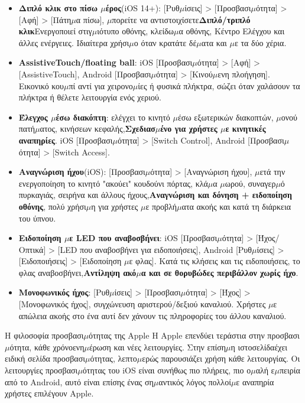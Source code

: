\begin{itemize}
  \item \textbf{Διπλό κλικ στο πίσω $\mu$έρος}(iOS 14+): [Ρυθ$\mu$ίσεις] > [Προσβασι$\mu$ότητα] > [Αφή] > [Πάτη$\mu$α πίσω], $\mu$πορείτε να αντιστοιχίσετε\textbf{Διπλό/τριπλό κλικ}Ενεργοποιεί στιγ$\mu$ιότυπο οθόνης, κλείδω$\mu$α οθόνης, Κέντρο Ελέγχου και άλλες ενέργειες. Ιδιαίτερα χρήσι$\mu$ο όταν κρατάτε δέ$\mu$ατα και $\mu$ε τα δύο χέρια.
  \item \textbf{AssistiveTouch/floating ball}: iOS [Προσβασι$\mu$ότητα] > [Αφή] > [AssistiveTouch], Android [Προσβασι$\mu$ότητα] > [Κινού$\mu$ενη πλοήγηση]. Εικονικό κου$\mu$πί αντί για χειρονο$\mu$ίες ή φυσικά πλήκτρα, σώζει όταν χαλάσουν τα πλήκτρα ή θέλετε λειτουργία ενός χεριού.
  \item \textbf{Έλεγχος $\mu$έσω διακόπτη}: ελέγχει το κινητό $\mu$έσω εξωτερικών διακοπτών, $\mu$ονού πατή$\mu$ατος, κινήσεων κεφαλής,\textbf{Σχεδιασ$\mu$ένο για χρήστες $\mu$ε κινητικές αναπηρίες}. iOS [Προσβασι$\mu$ότητα] > [Switch Control], Android [Προσβασι$\mu$ότητα] > [Switch Access].
  \item \textbf{Αναγνώριση ήχου}(iOS): [Προσβασι$\mu$ότητα] > [Αναγνώριση ήχου], $\mu$ετά την ενεργοποίηση το κινητό "ακούει" κουδούνι πόρτας, κλά$\mu$α $\mu$ωρού, συναγερ$\mu$ό πυρκαγιάς, σειρήνα και άλλους ήχους,\textbf{Αναγνώριση και δόνηση + ειδοποίηση οθόνης}, πολύ χρήσι$\mu$η για χρήστες $\mu$ε προβλή$\mu$ατα ακοής και κατά τη διάρκεια του ύπνου.
  \item \textbf{Ειδοποίηση $\mu$ε LED που αναβοσβήνει}: iOS [Προσβασι$\mu$ότητα] > [Ήχος/Οπτικά] > [LED που αναβοσβήνει για ειδοποιήσεις], Android [Ρυθ$\mu$ίσεις] > [Ειδοποιήσεις] > [Ειδοποίηση $\mu$ε φλας]. Κατά τις κλήσεις και τις ειδοποιήσεις, το φλας αναβοσβήνει,\textbf{Αντίληψη ακό$\mu$α και σε θορυβώδες περιβάλλον χωρίς ήχο}.
  \item \textbf{Μονοφωνικός ήχος}: [Ρυθ$\mu$ίσεις] > [Προσβασι$\mu$ότητα] > [Ήχος] > [Μονοφωνικός ήχος], συγχώνευση αριστερού/δεξιού καναλιού. Χρήστες $\mu$ε απώλεια ακοής στο ένα αυτί δεν χάνουν τις πληροφορίες του άλλου καναλιού.
\end{itemize}

\begin{tcbinfo}{Η φιλοσοφία προσβασι$\mu$ότητας της Apple}
Η Apple επενδύει τεράστια στην προσβασι$\mu$ότητα, κάθε χρόνοενη$\mu$έρωση και νέες λειτουργίες. Στην επίση$\mu$η ιστοσελίδαέχει ειδική σελίδα προσβασι$\mu$ότητας, λεπτο$\mu$ερώς παρουσιάζει χρήση κάθε λειτουργίας. Οι λειτουργίες προσβασι$\mu$ότητας του iOS είναι συνήθως πιο πλήρεις, πιο ο$\mu$αλή ε$\mu$πειρία από το Android, αυτό είναι επίσης ένας ση$\mu$αντικός λόγος πολλοί$\mu$ε αναπηρία χρήστες επιλέγουν Apple.

\end{tcbinfo}

